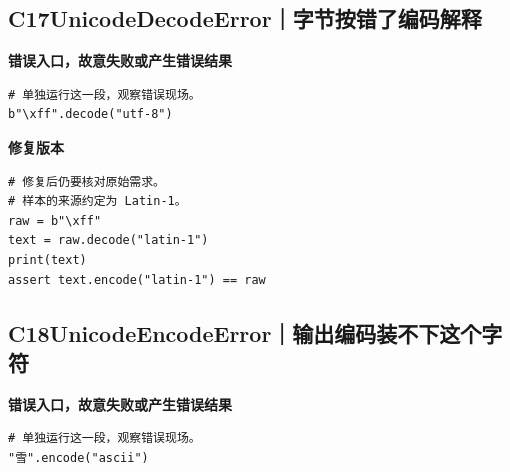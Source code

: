 \subsection*{C17\enspace UnicodeDecodeError｜字节按错了编码解释}





\textbf{错误入口，故意失败或产生错误结果}

\begin{lstlisting}[style=errorcode,title={错误复现（故意失败或错误结果）：\code{case_17_bad.py.txt}}]
# 单独运行这一段，观察错误现场。
b"\xff".decode("utf-8")
\end{lstlisting}

\textbf{修复版本}

\begin{lstlisting}[title={\code{case_17.py}}]
# 修复后仍要核对原始需求。
# 样本的来源约定为 Latin-1。
raw = b"\xff"
text = raw.decode("latin-1")
print(text)
assert text.encode("latin-1") == raw
\end{lstlisting}


\subsection*{C18\enspace UnicodeEncodeError｜输出编码装不下这个字符}





\textbf{错误入口，故意失败或产生错误结果}

\begin{lstlisting}[style=errorcode,title={错误复现（故意失败或错误结果）：\code{case_18_bad.py.txt}}]
# 单独运行这一段，观察错误现场。
"雪".encode("ascii")
\end{lstlisting}

